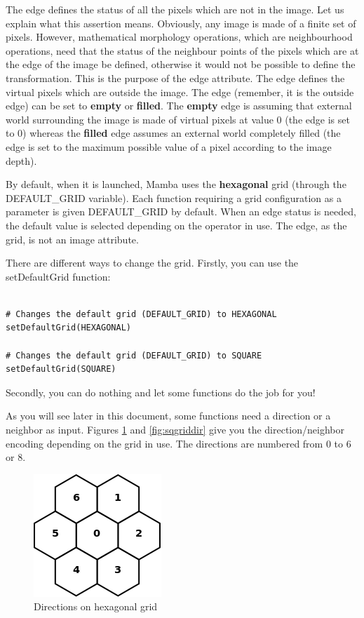 \documentclass[a4paper,10pt,oneside]{article}
\begin{document}
The edge defines the status of all the pixels which are not in the image. Let us 
explain what this assertion means. Obviously, any image is made of a finite set 
of pixels. However, mathematical morphology operations, which are neighbourhood 
operations, need that the status of the neighbour points of the pixels which are at 
the edge of the image be defined, otherwise it would not be possible to define the 
transformation. This is the purpose of the edge attribute. The edge defines the 
virtual pixels which are outside the image. The edge (remember, it is the outside 
edge) can be set to \textbf{empty} or 
\textbf{filled}. The \textbf{empty} edge is assuming that external world surrounding 
the image is made of virtual pixels at value 0 (the edge is set to 0) whereas 
the \textbf{filled} edge assumes an external world completely filled 
(the edge is set to the maximum possible value of a pixel according to the image 
depth). 

By default, when it is launched, Mamba uses the \textbf{hexagonal} grid (through 
the DEFAULT\_GRID variable). Each function requiring a grid configuration as a parameter is 
given DEFAULT\_GRID by default. When an edge status is needed, the default
value is selected depending on the operator in use. The edge, as the grid, is not 
an image attribute.

There are different ways to change the grid. Firstly, you can use the setDefaultGrid 
function:

\lstset{language=Python}
\begin{lstlisting}

# Changes the default grid (DEFAULT_GRID) to HEXAGONAL
setDefaultGrid(HEXAGONAL)

# Changes the default grid (DEFAULT_GRID) to SQUARE
setDefaultGrid(SQUARE)
\end{lstlisting}

Secondly, you can do nothing and let some functions do the job for you!

As you will see later in this document, some functions need a direction or a 
neighbor as input. Figures \ref{fig:hxgriddir} and \ref{fig:sqgriddir} give you
the direction/neighbor encoding depending on the grid in use. The directions
are numbered from 0 to 6 or 8.

\begin{figure}
\centering
\includegraphics[scale=0.3]{hxGriddir.png}
\caption{Directions on hexagonal grid}
\label{fig:hxgriddir}
\end{figure}
\end{document}

